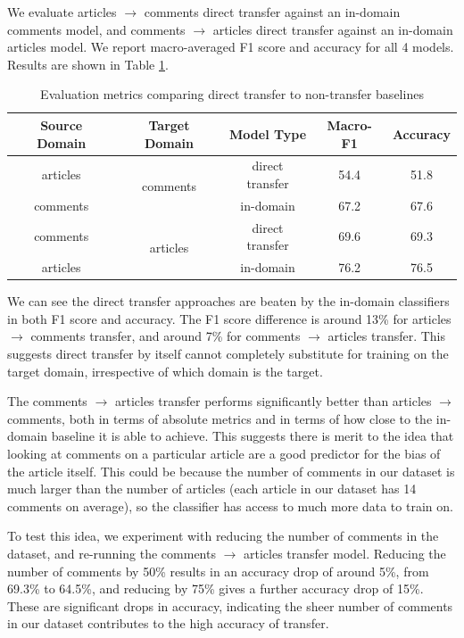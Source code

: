 We evaluate articles $ \rightarrow $ comments direct transfer against an in-domain comments model, and comments $ \rightarrow $ articles direct transfer against an in-domain articles model. We report macro-averaged F1 score and accuracy for all 4 models. Results are shown in Table \ref{tab:direct-transfer-results}.

\begin{table}[ht]
    \centering
    \begin{tabular}{|c|c|c|c|c|}
        \hline
        \textbf{Source Domain} & \textbf{Target Domain} & \textbf{Model Type} & \textbf{Macro-F1} & \textbf{Accuracy} \\
        \hline
        articles & \multirow{2}{4em}{comments} & direct transfer & 54.4 & 51.8 \\
        comments & & in-domain & 67.2 & 67.6 \\
        \hline
        comments & \multirow{2}{3em}{articles} & direct transfer & 69.6 & 69.3 \\
        articles & & in-domain & 76.2 & 76.5 \\
        \hline
    \end{tabular}
    \caption{Evaluation metrics comparing direct transfer to non-transfer baselines}
    \label{tab:direct-transfer-results}
\end{table}

We can see the direct transfer approaches are beaten by the in-domain classifiers in both F1 score and accuracy. The F1 score difference is around 13\% for articles $ \rightarrow $ comments transfer, and around 7\% for comments $ \rightarrow $ articles transfer. This suggests direct transfer by itself cannot completely substitute for training on the target domain, irrespective of which domain is the target.

The comments $ \rightarrow $ articles transfer performs significantly better than articles $ \rightarrow $ comments, both in terms of absolute metrics and in terms of how close to the in-domain baseline it is able to achieve. This suggests there is merit to the idea that looking at comments on a particular article are a good predictor for the bias of the article itself. This could be because the number of comments in our dataset is much larger than the number of articles (each article in our dataset has 14 comments on average), so the classifier has access to much more data to train on.

To test this idea, we experiment with reducing the number of comments in the dataset, and re-running the comments $ \rightarrow $ articles transfer model. Reducing the number of comments by 50\% results in an accuracy drop of around 5\%, from 69.3\% to 64.5\%, and reducing by 75\% gives a further accuracy drop of 15\%. These are significant drops in accuracy, indicating the sheer number of comments in our dataset contributes to the high accuracy of transfer.

